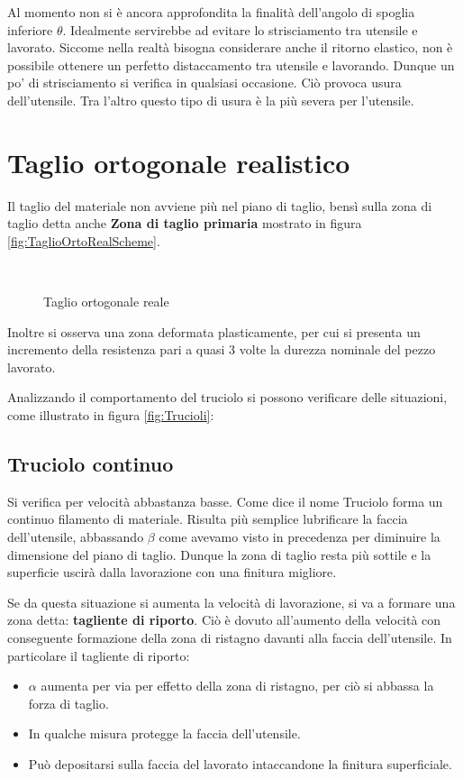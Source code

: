 Al momento non si è ancora approfondita la finalità dell'angolo di spoglia inferiore $\theta$.
Idealmente servirebbe ad evitare lo strisciamento tra utensile e lavorato.
Siccome nella realtà bisogna considerare anche il ritorno elastico, non è possibile ottenere
un perfetto distaccamento tra utensile e lavorando. Dunque un po' di strisciamento si 
verifica in qualsiasi occasione. Ciò provoca usura dell'utensile.
Tra l'altro questo tipo di usura è la più severa per l'utensile.


\section{Taglio ortogonale realistico}
Il taglio del materiale non avviene più nel piano
di taglio, bensì sulla zona di taglio detta anche
\textbf{Zona di taglio primaria} mostrato in 
figura \ref{fig:TaglioOrtoRealScheme}.

\begin{figure}
\centering
{}\\
\caption{Taglio ortogonale reale}
\label{fig:TaglioOrtoreal}
\end{figure}

Inoltre si osserva una zona deformata plasticamente, per cui si presenta un incremento della 
resistenza pari a quasi 3 volte la durezza nominale del pezzo lavorato.

Analizzando il comportamento del truciolo si possono
verificare delle situazioni, come illustrato in figura \ref{fig:Trucioli}:
\subsection{Truciolo continuo} Si verifica per velocità abbastanza basse. Come dice il nome Truciolo forma un continuo filamento di materiale.
Risulta più semplice lubrificare la faccia dell'utensile, abbassando $\beta$ come avevamo visto
in precedenza per diminuire la dimensione del piano di taglio. Dunque la zona di taglio resta più sottile
e la superficie uscirà dalla lavorazione con una 
finitura migliore.

Se da questa situazione si aumenta la velocità di
lavorazione, si va a formare una zona detta: 
\textbf{tagliente di riporto}.
Ciò è dovuto all'aumento della velocità con conseguente formazione della zona di ristagno
davanti alla faccia dell'utensile.
In particolare il tagliente di riporto:
\begin{itemize}
\item $\alpha$ aumenta per via per effetto della
zona di ristagno, per ciò si abbassa la forza di 
taglio.
\item In qualche misura protegge la faccia dell'utensile.
\item Può depositarsi sulla faccia del lavorato 
intaccandone la finitura superficiale.
\end{itemize}

